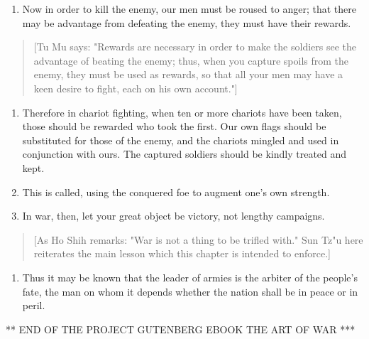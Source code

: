 \documentclass[10pt,a4paper]{book}
\begin{document}
\begin{enumerate}[leftmargin=*, label=\arabic*., wide=0pt, resume]
\item Now in order to kill the enemy, our men must be roused to anger; that there may be advantage from defeating the enemy, they must have their rewards.
\end{enumerate}

{\small
\begin{quote}
[Tu Mu says: "Rewards are necessary in order to make the soldiers see the advantage of beating the enemy; thus, when you capture spoils from the enemy, they must be used as rewards, so that all your men may have a keen desire to fight, each on his own account."]
\end{quote}
}

\begin{enumerate}[leftmargin=*, label=\arabic*., wide=0pt, resume]
\item Therefore in chariot fighting, when ten or more chariots have been taken, those should be rewarded who took the first. Our own flags should be substituted for those of the enemy, and the chariots mingled and used in conjunction with ours. The captured soldiers should be kindly treated and kept.
\item This is called, using the conquered foe to augment one's own strength.
\item In war, then, let your great object be victory, not lengthy campaigns.
\end{enumerate}

{\small
\begin{quote}
[As Ho Shih remarks: "War is not a thing to be trifled with." Sun Tz"u here reiterates the main lesson which this chapter is intended to enforce.]
\end{quote}
}

\begin{enumerate}[leftmargin=*, label=\arabic*., wide=0pt, resume]
\item Thus it may be known that the leader of armies is the arbiter of the people's fate, the man on whom it depends whether the nation shall be in peace or in peril.
\end{enumerate}

\newpage
{}
{}

\begin{center}
{\footnotesize *** END OF THE PROJECT GUTENBERG EBOOK THE ART OF WAR ***}
\end{center}
\end{document}
